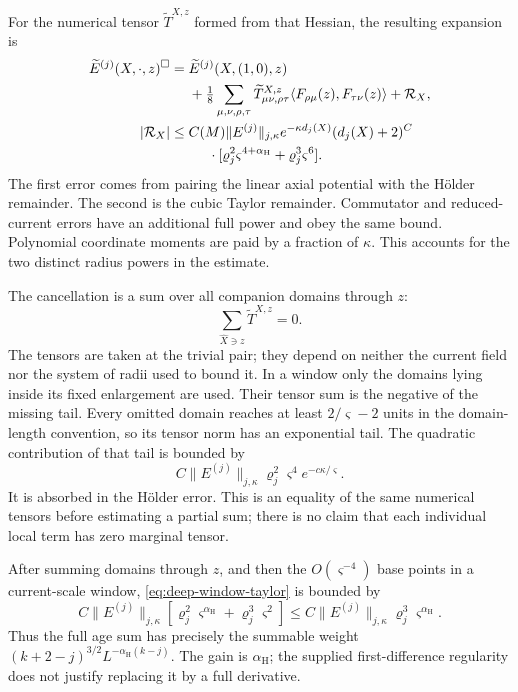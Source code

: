 \documentclass[11pt,letterpaper,reqno]{amsart}
\theoremstyle{definition}
\theoremstyle{remark}
\begin{document}
For the numerical tensor $\widetilde T^{X,z}$ formed from
that Hessian, the resulting expansion is
\begin{equation}\label{eq:deep-window-taylor}
 \begin{split}
 \widetilde E^{(j)}(X,\cdot,z)^\square
  ={}&\widetilde E^{(j)}(X,(1,0),z)\\
     &+\tfrac18\sum_{\mu,\nu,\rho,\tau}
          \widetilde T^{X,z}_{\mu\nu,\rho\tau}
                   \langle F_{\rho\mu}(z),F_{\tau\nu}(z)\rangle
       +\mathcal R_X,\\
 |\mathcal R_X|
  \le{}&C(M)\|E^{(j)}\|_{j,\kappa}e^{-\kappa d_j(X)}
             (d_j(X)+2)^C\\
       &\hspace{5mm}\cdot
           [\varrho_j^2\varsigma^{4+\alpha_{\mathrm H}}
                              +\varrho_j^3\varsigma^6].
 \end{split}
\end{equation}
The first error comes from pairing the linear axial potential
with the H\"older remainder. The second is the cubic Taylor
remainder. Commutator and reduced-current errors have an
additional full power and obey the same bound. Polynomial
coordinate moments are paid by a fraction of $\kappa$.
This accounts for the two distinct radius powers in the
estimate.

The cancellation is a sum over all companion domains through
$z$:
\[
             \sum_{\widehat X\ni z}\widetilde T^{X,z}=0.
\]
The tensors are taken at the trivial pair; they depend on
neither the current field nor the system of radii used to
bound it. In a window only the domains lying inside its fixed
enlargement are used. Their tensor sum is the negative of the
missing tail. Every omitted domain reaches at least
$2/\varsigma-2$ units in the domain-length convention, so its
tensor norm has an exponential tail. The quadratic contribution
of that tail is bounded by
\[
 C\|E^{(j)}\|_{j,\kappa}\varrho_j^2\varsigma^4
                                           e^{-c\kappa/\varsigma}.
\]
It is absorbed in the H\"older error. This is an equality of
the same numerical tensors before estimating a partial sum;
there is no claim that each individual local term has zero
marginal tensor.

After summing domains through $z$, and then the
$O(\varsigma^{-4})$ base points in a current-scale window,
\eqref{eq:deep-window-taylor} is bounded by
\[
 C\|E^{(j)}\|_{j,\kappa}
          [\varrho_j^2\varsigma^{\alpha_{\mathrm H}}
                                     +\varrho_j^3\varsigma^2]
 \le C\|E^{(j)}\|_{j,\kappa}
                    \varrho_j^3\varsigma^{\alpha_{\mathrm H}}.
\]
Thus the full age sum has precisely the summable weight
$(k+2-j)^{3/2}L^{-\alpha_{\mathrm H}(k-j)}$.
The gain is $\alpha_{\mathrm H}$; the supplied first-difference
regularity does not justify replacing it by a full derivative.
\end{document}
